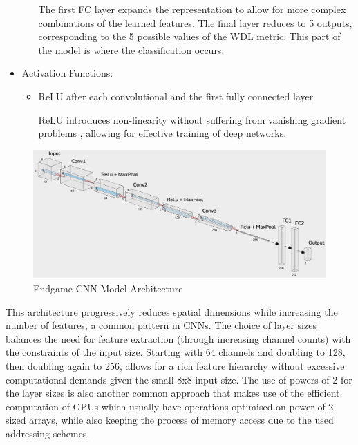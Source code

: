\begin{itemize}
\begin{itemize}
        The first FC layer expands the representation to allow for more complex combinations of the learned features. The final layer reduces to 5 outputs, corresponding to the 5 possible values of the WDL metric. This part of the model is where the classification occurs.
    \end{itemize}
    
    \item Activation Functions:
    \begin{itemize}
        \item ReLU after each convolutional and the first fully connected layer
        
        ReLU introduces non-linearity without suffering from vanishing gradient problems \cite{krizhevskyAlexNet}, allowing for effective training of deep networks.
    \end{itemize}
\end{itemize}

\begin{figure}[H]
    \centering
    \includegraphics[width = \textwidth]{images/CNNArchitectureLabelled.png}
    \caption{Endgame CNN Model Architecture}
    \label{fig: CNNArch}
\end{figure}

This architecture progressively reduces spatial dimensions while increasing the number of features, a common pattern in CNNs. The choice of layer sizes balances the need for feature extraction (through increasing channel counts) with the constraints of the input size. Starting with 64 channels and doubling to 128, then doubling again to 256, allows for a rich feature hierarchy without excessive computational demands given the small 8x8 input size. The use of powers of 2 for the layer sizes is also another common approach that makes use of the efficient computation of GPUs which usually have operations optimised on power of 2 sized arrays, while also keeping the process of memory access due to the used addressing schemes.

